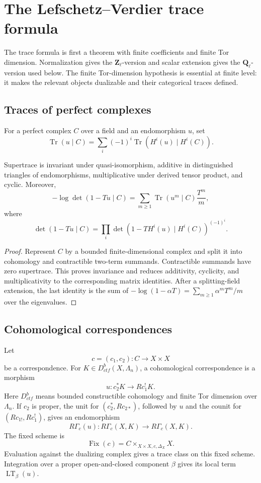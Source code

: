 \chapter{The Lefschetz--Verdier trace formula}
\label{ch:trace-formula}

The trace formula is first a theorem with finite coefficients and finite Tor
dimension.  Normalization gives the \(\mathbf Z_\ell\)-version and scalar
extension gives the \(\mathbf Q_\ell\)-version used below.  The finite
Tor-dimension hypothesis is essential at finite level: it makes the relevant
objects dualizable and their categorical traces defined.

\section{Traces of perfect complexes}

For a perfect complex \(C\) over a field and an endomorphism \(u\), set
\[
 \operatorname{Tr}(u\mid C)
 =\sum_i(-1)^i\operatorname{Tr}(H^i(u)\mid H^i(C)).
\]

\begin{lemma}
\label{lem:perfect-supertrace}
Supertrace is invariant under quasi-isomorphism, additive in distinguished
triangles of endomorphisms, multiplicative under derived tensor product, and
cyclic.  Moreover,
\[
 -\log\det(1-Tu\mid C)
 =\sum_{m\geq1}\operatorname{Tr}(u^m\mid C)\frac{T^m}{m},
\]
where
\[
 \det(1-Tu\mid C)
 =\prod_i\det(1-TH^i(u)\mid H^i(C))^{(-1)^i}.
\]
\end{lemma}

\begin{proof}
Represent \(C\) by a bounded finite-dimensional complex and split it into
cohomology and contractible two-term summands.  Contractible summands have
zero supertrace.  This proves invariance and reduces additivity, cyclicity,
and multiplicativity to the corresponding matrix identities.  After a
splitting-field extension, the last identity is the sum of
\(-\log(1-\alpha T)=\sum_{m\geq1}\alpha^mT^m/m\) over the eigenvalues.
\end{proof}

\section{Cohomological correspondences}

Let
\[
 c=(c_1,c_2):C\longrightarrow X\times X
\]
be a correspondence.  For
\(K\in D^b_{ctf}(X,\Lambda_n)\), a cohomological correspondence is a morphism
\[
 u:c_2^*K\longrightarrow Rc_1^!K.
\]
Here \(D^b_{ctf}\) means bounded constructible cohomology and finite Tor
dimension over \(\Lambda_n\).  If \(c_2\) is proper, the unit for
\((c_2^*,Rc_{2*})\), followed by \(u\) and the counit for
\((Rc_{1!},Rc_1^!)\), gives an endomorphism
\[
 R\Gamma_c(u):R\Gamma_c(X,K)\longrightarrow R\Gamma_c(X,K).
\]
The fixed scheme is
\[
 \operatorname{Fix}(c)
 =C\times_{X\times X,c,\Delta_X}X.
\]
Evaluation against the dualizing complex gives a trace class on this fixed
scheme.  Integration over a proper open-and-closed component
\(\beta\) gives its local term \(\operatorname{LT}_\beta(u)\).

